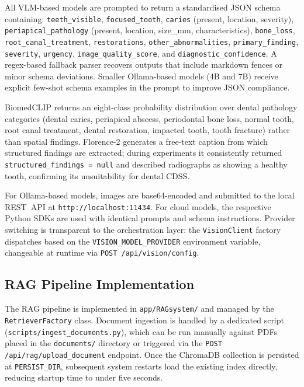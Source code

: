 \documentclass[12pt,a4paper]{report}
\begin{document}
	All VLM-based models are prompted to return a standardised JSON schema
	containing: \texttt{teeth\_visible}, \texttt{focused\_tooth},
	\texttt{caries} (present, location, severity),
	\texttt{periapical\_pathology} (present, location, size\_mm,
	characteristics), \texttt{bone\_loss}, \texttt{root\_canal\_treatment},
	\texttt{restorations}, \texttt{other\_abnormalities},
	\texttt{primary\_finding}, \texttt{severity}, \texttt{urgency},
	\texttt{image\_quality\_score}, and \texttt{diagnostic\_confidence}.  A
	regex-based fallback parser recovers outputs that include markdown fences
	or minor schema deviations.  Smaller Ollama-based models (4B and 7B)
	receive explicit few-shot schema examples in the prompt to improve JSON
	compliance.
	
	BiomedCLIP returns an eight-class probability distribution over dental
	pathology categories (dental caries, periapical abscess, periodontal
	bone loss, normal tooth, root canal treatment, dental restoration,
	impacted tooth, tooth fracture) rather than spatial findings.
	Florence-2 generates a free-text caption from which structured findings
	are extracted; during experiments it consistently returned
	\texttt{structured\_findings~= null} and described radiographs as showing
	a healthy tooth, confirming its unsuitability for dental CDSS.
	
	For Ollama-based models, images are base64-encoded and submitted to the
	local REST~API at \texttt{http://localhost:11434}.  For cloud models,
	the respective Python SDKs are used with identical prompts and schema
	instructions.  Provider switching is transparent to the orchestration
	layer: the \texttt{VisionClient} factory dispatches based on the
	\texttt{VISION\_MODEL\_PROVIDER} environment variable, changeable at
	runtime via \texttt{POST /api/vision/config}.
	
	\subsection{RAG Pipeline Implementation}
	\label{subsec:rag_impl}
	
	The RAG pipeline is implemented in \texttt{app/RAGsystem/} and managed
	by the \texttt{RetrieverFactory} class.  Document ingestion is handled
	by a dedicated script (\texttt{scripts/ingest\_documents.py}), which
	can be run manually against PDFs placed in the \texttt{documents/}
	directory or triggered via the \texttt{POST /api/rag/upload\_document}
	endpoint.  Once the ChromaDB collection is persisted at
	\texttt{PERSIST\_DIR}, subsequent system restarts load the existing
	index directly, reducing startup time to under five seconds.
	
\end{document}
